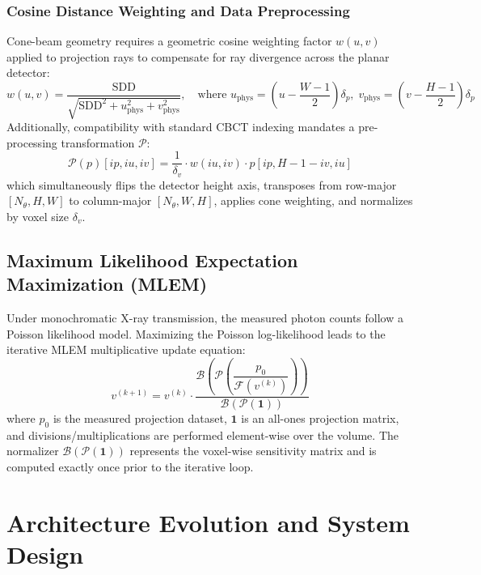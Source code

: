 \documentclass[11pt,a4paper]{article}
\begin{document}
\subsubsection{Cosine Distance Weighting and Data Preprocessing}
Cone-beam geometry requires a geometric cosine weighting factor $w(u, v)$ applied to projection rays to compensate for ray divergence across the planar detector:
\begin{equation}
    w(u, v) = \frac{\text{SDD}}{\sqrt{\text{SDD}^2 + u_{\text{phys}}^2 + v_{\text{phys}}^2}}, \quad \text{where } u_{\text{phys}} = \left(u - \frac{W-1}{2}\right)\delta_p, \; v_{\text{phys}} = \left(v - \frac{H-1}{2}\right)\delta_p
    \label{eq:cone_weight}
\end{equation}
Additionally, compatibility with standard CBCT indexing mandates a pre-processing transformation $\mathcal{P}$:
\begin{equation}
    \mathcal{P}(p)[ip, iu, iv] = \frac{1}{\delta_v} \cdot w(iu, iv) \cdot p[ip, H - 1 - iv, iu]
    \label{eq:preprocess}
\end{equation}
which simultaneously flips the detector height axis, transposes from row-major $[N_\theta, H, W]$ to column-major $[N_\theta, W, H]$, applies cone weighting, and normalizes by voxel size $\delta_v$.

\subsection{Maximum Likelihood Expectation Maximization (MLEM)}
Under monochromatic X-ray transmission, the measured photon counts follow a Poisson likelihood model. Maximizing the Poisson log-likelihood leads to the iterative MLEM multiplicative update equation:
\begin{equation}
    v^{(k+1)} = v^{(k)} \cdot \frac{\mathcal{B}\left(\mathcal{P}\left(\dfrac{p_0}{\mathcal{F}(v^{(k)})}\right)\right)}{\mathcal{B}\left(\mathcal{P}(\mathbf{1})\right)}
    \label{eq:mlem_update}
\end{equation}
where $p_0$ is the measured projection dataset, $\mathbf{1}$ is an all-ones projection matrix, and divisions/multiplications are performed element-wise over the volume. The normalizer $\mathcal{B}(\mathcal{P}(\mathbf{1}))$ represents the voxel-wise sensitivity matrix and is computed exactly once prior to the iterative loop.

\section{Architecture Evolution and System Design}
\label{sec:arch}
\end{document}
